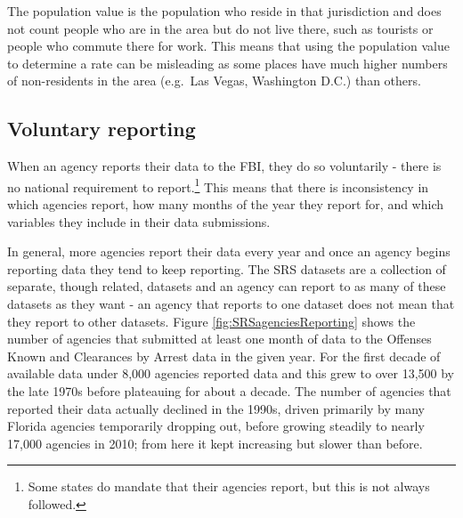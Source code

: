 \documentclass[
]{krantz}
\begin{document}
The population value is the population who reside in that
jurisdiction and does not count people who are in the area
but do not live there, such as tourists or people who
commute there for work. This means that using the population
value to determine a rate can be misleading as some places
have much higher numbers of non-residents in the area
(e.g.~Las Vegas, Washington D.C.) than others.

\subsection{Voluntary reporting}\label{voluntary}

When an agency reports their data to the FBI, they do so
voluntarily - there is no national requirement to
report.\footnote{Some states do mandate that their agencies
  report, but this is not always followed.} This means that
there is inconsistency in which agencies report, how many
months of the year they report for, and which variables they
include in their data submissions.

In general, more agencies report their data every year and
once an agency begins reporting data they tend to keep
reporting. The SRS datasets are a collection of separate,
though related, datasets and an agency can report to as many
of these datasets as they want - an agency that reports to
one dataset does not mean that they report to other
datasets. Figure \ref{fig:SRSagenciesReporting} shows the
number of agencies that submitted at least one month of data
to the Offenses Known and Clearances by Arrest data in the
given year. For the first decade of available data under
8,000 agencies reported data and this grew to over 13,500 by
the late 1970s before plateauing for about a decade. The
number of agencies that reported their data actually
declined in the 1990s, driven primarily by many Florida
agencies temporarily dropping out, before growing steadily
to nearly 17,000 agencies in 2010; from here it kept
increasing but slower than before.
\end{document}
